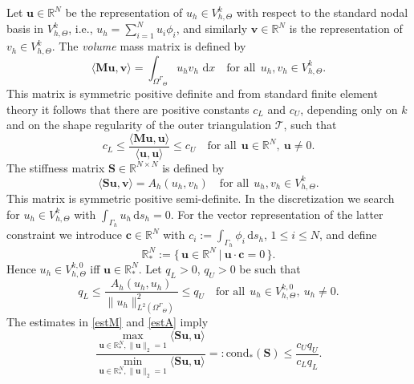 \documentclass[final]{siamltex}
\begin{document}
Let ${\mathbf{u}} \in \mathbb{R}^N$ be the representation of $u_h \in V_{h,\Theta}^k$ with respect to the standard nodal basis in $V_{h,\Theta}^k$, i.e., $u_h =\sum_{i=1}^N u_i \phi_i$, and similarly ${\mathbf v} \in \mathbb{R}^N$ is the representation of $v_h \in V_{h,\Theta}^k$.
The \emph{volume} mass matrix is defined by 
\[
  \langle {\mathbf{M}} {\mathbf{u}},{\mathbf v}\rangle= \int_{{\Omega^{\Gamma}}_\Theta} u_h v_h \, {\,\mathrm{d} {x}} \quad \text{for all}~~u_h,v_h \in {V_{h,\Theta}^k}.
\]
This matrix is symmetric positive definite and from standard finite element theory it follows that there are positive constants $c_L$ and $c_U$, depending only on $k$ and on the shape regularity of the outer triangulation ${\mathcal{T}}$, such that
\begin{equation} \label{estM}
 c_L \leq \frac{\langle {\mathbf{M}} {\mathbf{u}}, {\mathbf{u}} \rangle}{\langle{\mathbf{u}},{\mathbf{u}}\rangle} \leq c_U \quad \text{for all}~~{\mathbf{u}} \in \mathbb{R}^N, ~ {\mathbf{u}} \neq 0.
\end{equation}
The stiffness matrix ${\mathbf S} \in \mathbb{R}^{N\times N}$ is defined by
\[
  \langle {\mathbf S} {\mathbf{u}}, {\mathbf v}\rangle= A_h(u_h,v_h) \quad \text{for all}~~u_h,v_h \in V_{h,\Theta}^k.
\]
This matrix is symmetric positive semi-definite. In the discretization we search for $u_h \in V_{h,\Theta}^k$ with $\int_{\Gamma_h} u_h {\,\mathrm{d} s}_h=0$. For the vector representation of the latter constraint we introduce ${\mathbf{c}} \in \mathbb{R}^N$ with $c_i:= \int_{\Gamma_h} \phi_i {\,\mathrm{d} s}_h$, $1\leq i \leq N$, and define 
\begin{equation} \label{cdef}
\mathbb{R}^N_\ast:= \{\, {\mathbf{u}} \in \mathbb{R}^N~|~{\mathbf{u}}\cdot {\mathbf{c}} =0\,\}. 
\end{equation}
Hence $u_h \in {V_{h,\Theta}^{k,0}}$ iff ${\mathbf{u}} \in \mathbb{R}^N_\ast$.
Let $q_L >0$, $q_U >0$ be such that
\begin{equation}\label{estA}
 q_L \leq \frac{A_h(u_h,u_h)}{\|u_h\|_{L^2({\Omega^{\Gamma}}_\Theta)}^2} \leq q_U \quad \text{for all}~~u_h \in {V_{h,\Theta}^{k,0}}, ~u_h \neq 0.
\end{equation}
The estimates in \eqref{estM} and \eqref{estA} imply
\begin{equation} \label{estS}
 \frac{\max_{{\mathbf{u}} \in \mathbb{R}^N_\ast, \|{\mathbf{u}}\|_2=1}\langle {\mathbf S} {\mathbf{u}}, {\mathbf{u}} \rangle}{\min_{{\mathbf{u}} \in \mathbb{R}^N_\ast, \|{\mathbf{u}}\|_2=1}\langle {\mathbf S} {\mathbf{u}}, {\mathbf{u}} \rangle} =: \operatorname{cond_\ast}({\mathbf S}) \leq \frac{c_U q_U}{c_Lq_L}.
\end{equation}
\end{document}
